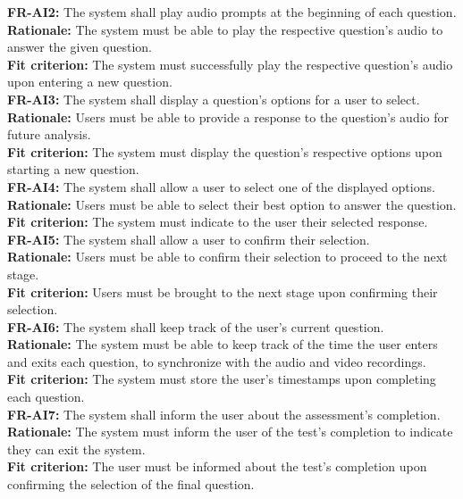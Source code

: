 \documentclass[12pt]{article}
\begin{document}
\textbf{FR-AI2: }The system shall play audio prompts at the beginning of each question.\\
\textbf{Rationale: }The system must be able to play the respective question's audio to answer the given question.\\
\textbf{Fit criterion: }The system must successfully play the respective question's audio upon entering a new question.\\

\textbf{FR-AI3: }The system shall display a question's options for a user to select.\\
\textbf{Rationale: }Users must be able to provide a response to the question's audio for future analysis.\\
\textbf{Fit criterion: }The system must display the question's respective options upon starting a new question.\\

\textbf{FR-AI4: }The system shall allow a user to select one of the displayed options.\\
\textbf{Rationale: }Users must be able to select their best option to answer the question.\\
\textbf{Fit criterion: }The system must indicate to the user their selected response.\\

\textbf{FR-AI5: }The system shall allow a user to confirm their selection.\\
\textbf{Rationale: }Users must be able to confirm their selection to proceed to the next stage.\\
\textbf{Fit criterion: }Users must be brought to the next stage upon confirming their selection.\\

\textbf{FR-AI6: }The system shall keep track of the user's current question.\\
\textbf{Rationale: }The system must be able to keep track of the time the user enters and exits each question, to synchronize with the audio and video recordings.\\
\textbf{Fit criterion: }The system must store the user's timestamps upon completing each question.\\

\textbf{FR-AI7: }The system shall inform the user about the assessment's completion.\\
\textbf{Rationale: }The system must inform the user of the test's completion to indicate they can exit the system.\\
\textbf{Fit criterion: }The user must be informed about the test's completion upon confirming the selection of the final question.\\
\end{document}
